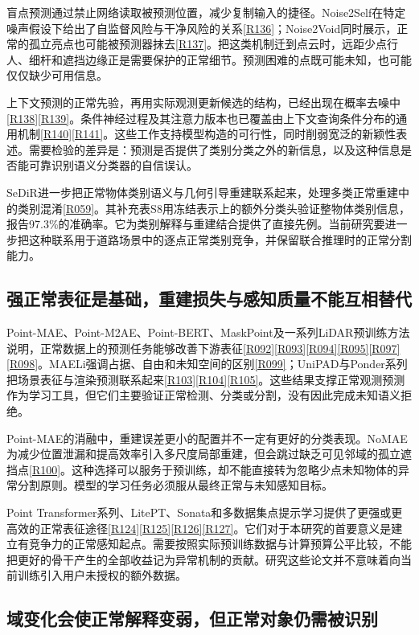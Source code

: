 \documentclass[11pt,a4paper]{article}
\newcommand{\paper}[1]{\allowbreak\hyperlink{#1}{[#1]}\allowbreak}
\begin{document}
盲点预测通过禁止网络读取被预测位置，减少复制输入的捷径。Noise2Self在特定噪声假设下给出了自监督风险与干净风险的关系\paper{R136}；Noise2Void同时展示，正常的孤立亮点也可能被预测器抹去\paper{R137}。把这类机制迁到点云时，远距少点行人、细杆和遮挡边缘正是需要保护的正常细节。预测困难的点既可能未知，也可能仅仅缺少可用信息。

上下文预测的正常先验，再用实际观测更新候选的结构，已经出现在概率去噪中\paper{R138}\paper{R139}。条件神经过程及其注意力版本也已覆盖由上下文查询条件分布的通用机制\paper{R140}\paper{R141}。这些工作支持模型构造的可行性，同时削弱宽泛的新颖性表述。需要检验的差异是：预测是否提供了类别分类之外的新信息，以及这种信息是否能可靠识别语义分类器的自信误认。

SeDiR进一步把正常物体类别语义与几何引导重建联系起来，处理多类正常重建中的类别混淆\paper{R059}。其补充表S8用冻结表示上的额外分类头验证整物体类别信息，报告97.3\%的准确率。它为类别解释与重建结合提供了直接先例。当前研究要进一步把这种联系用于道路场景中的逐点正常类别竞争，并保留联合推理时的正常分割能力。

\subsection{强正常表征是基础，重建损失与感知质量不能互相替代}

Point-MAE、Point-M2AE、Point-BERT、MaskPoint及一系列LiDAR预训练方法说明，正常数据上的预测任务能够改善下游表征\paper{R092}\paper{R093}\paper{R094}\paper{R095}\paper{R097}\paper{R098}。MAELi强调占据、自由和未知空间的区别\paper{R099}；UniPAD与Ponder系列把场景表征与渲染预测联系起来\paper{R103}\paper{R104}\paper{R105}。这些结果支撑正常观测预测作为学习工具，但它们主要验证正常检测、分类或分割，没有因此完成未知语义拒绝。

Point-MAE的消融中，重建误差更小的配置并不一定有更好的分类表现。NoMAE为减少位置泄漏和提高效率引入多尺度局部重建，但会跳过缺乏可见邻域的孤立遮挡点\paper{R100}。这种选择可以服务于预训练，却不能直接转为忽略少点未知物体的异常分割原则。模型的学习任务必须服从最终正常与未知感知目标。

Point Transformer系列、LitePT、Sonata和多数据集点提示学习提供了更强或更高效的正常表征途径\paper{R124}\paper{R125}\paper{R126}\paper{R127}。它们对于本研究的首要意义是建立有竞争力的正常感知起点。需要按照实际预训练数据与计算预算公平比较，不能把更好的骨干产生的全部收益记为异常机制的贡献。研究这些论文并不意味着向当前训练引入用户未授权的额外数据。

\subsection{域变化会使正常解释变弱，但正常对象仍需被识别}
\end{document}
